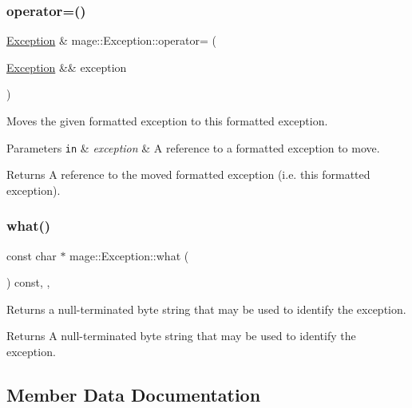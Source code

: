 \subsubsection{\texorpdfstring{operator=()}{operator=()}\hspace{0.1cm}{\footnotesize\ttfamily [2/2]}}
{\footnotesize\ttfamily \mbox{\hyperlink{classmage_1_1_exception}{Exception}} \& mage\+::\+Exception\+::operator= (\begin{DoxyParamCaption}\item[{\mbox{\hyperlink{classmage_1_1_exception}{Exception}} \&\&}]{exception }\end{DoxyParamCaption})\hspace{0.3cm}{\ttfamily [default]}}

Moves the given formatted exception to this formatted exception.


\begin{DoxyParams}[1]{Parameters}
\mbox{\tt in}  & {\em exception} & A reference to a formatted exception to move. \\
\hline
\end{DoxyParams}
\begin{DoxyReturn}{Returns}
A reference to the moved formatted exception (i.\+e. this formatted exception). 
\end{DoxyReturn}
\mbox{\label{classmage_1_1_exception_ae2bd4437e2b7c960f022f7d3bf79baa7}} 
\subsubsection{\texorpdfstring{what()}{what()}}
{\footnotesize\ttfamily const char $\ast$ mage\+::\+Exception\+::what (\begin{DoxyParamCaption}{ }\end{DoxyParamCaption}) const\hspace{0.3cm}{\ttfamily [override]}, {\ttfamily [virtual]}, {\ttfamily [noexcept]}}

Returns a null-\/terminated byte string that may be used to identify the exception.

\begin{DoxyReturn}{Returns}
A null-\/terminated byte string that may be used to identify the exception. 
\end{DoxyReturn}


\subsection{Member Data Documentation}
\mbox{\label{classmage_1_1_exception_ad5bd9bb044bebaa1bac36c8c8a25c052}} 
